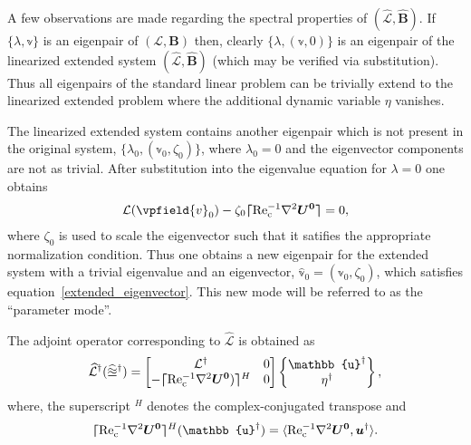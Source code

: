 A few observations are made regarding the spectral properties of $(\mathcal{\widehat{L}},\mathbf{\widehat{B}})$. If $\{\lambda,\mathbb{v}\}$ is an eigenpair of $(\mathcal{L},\mathbf{B})$ then, clearly $\{\lambda,(\mathbb{v},0)\}$ is an eigenpair of the linearized extended system $(\mathcal{\widehat{L}},\mathbf{\widehat{B}})$ (which may be verified via substitution). Thus all eigenpairs of the standard linear problem can be trivially extend to the linearized extended problem where the additional dynamic variable $\eta$ vanishes.

The linearized extended system contains another eigenpair which is not present in the original system, $\{\lambda_{0},(\mathbb{v}_{0},\zeta_{0})\}$, where $\lambda_{0} = 0$ and the eigenvector components are not as trivial. After substitution into the eigenvalue equation for $\lambda = 0$ one obtains
\begin{eqnarray}
	\mathcal{L}(\vpfield{v}_{0})  -
	\zeta_{0}\blbracket \invRec\nabla^{2}\vecUb \brbracket = 0, 
	\label{extended_eigenvector}
\end{eqnarray}
where $\zeta_{0}$ is used to scale the eigenvector such that it satifies the appropriate normalization condition. Thus one obtains a new eigenpair for the extended system with a trivial eigenvalue and an eigenvector, $\mathbb{\widehat{v}}_{0} = (\mathbb{v}_{0},\zeta_{0})$, which satisfies equation~\eqref{extended_eigenvector}. This new mode will be referred to as the ``parameter mode''.

 The adjoint operator corresponding to $\mathcal{\widehat{L}}$ is obtained as 
\begin{equation}
	\mathcal{\widehat{L}^{\dagger}}(\mathbb{\widehat{u}}^{\dagger}) = 
	\begin{bmatrix}
		\mathcal{L}^{\dagger}& 0 \\
		-\blbracket \invRec\nabla^{2}\vecUb) \brbracket^{H} 	& 0
	\end{bmatrix}
	\begin{Bmatrix}
		\mathbb{u}^{\dagger} \\
		\eta^{\dagger}
	\end{Bmatrix}
	\label{Adjoint_Lop_CM},
\end{equation} 
where, the superscript $^{H}$ denotes the complex-conjugated transpose and
\begin{eqnarray}
	\blbracket \invRec\nabla^{2}\vecUb \brbracket^{H}(\mathbb{u}^{\dagger}) = \langle\invRec\nabla^{2}\vecUb,\vecu^{\dagger}\rangle. \nonumber
\end{eqnarray}


